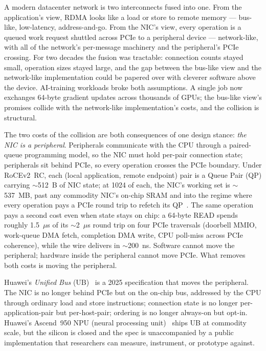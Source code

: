 \documentclass[10pt,twocolumn]{article}
\begin{document}
A modern datacenter network is two interconnects fused into one.
From the application's view, RDMA looks like a load or store to
remote memory --- bus-like, low-latency, address-and-go. From the
NIC's view, every operation is a queued work request shuttled
across PCIe to a peripheral device --- network-like, with all of
the network's per-message machinery and the peripheral's PCIe
crossing. For two decades the fusion was tractable: connection
counts stayed small, operation sizes stayed large, and the gap
between the bus-like view and the network-like implementation
could be papered over with cleverer software above the device.
AI-training workloads broke both assumptions. A single job now
exchanges 64-byte gradient updates across thousands of GPUs; the
bus-like view's promises collide with the network-like
implementation's costs, and the collision is structural.

The two costs of the collision are both consequences of one design
stance: \emph{the NIC is a peripheral}. Peripherals communicate
with the CPU through a paired-queue programming model, so the NIC
must hold per-pair connection state; peripherals sit behind PCIe,
so every operation crosses the PCIe boundary. Under RoCEv2~RC,
each (local application, remote endpoint) pair is a Queue Pair
(QP) carrying $\sim$512~B of NIC state; at 1024 of each, the NIC's
working set is $\sim$537~MB, past any commodity NIC's on-chip SRAM
and into the regime where every operation pays a PCIe round trip
to refetch its
QP~\cite{kong2022:collie,kalia:fasst-extended,wang2023:srnic}.
The same operation pays a second cost even when state stays on
chip: a 64-byte READ spends roughly 1.5~$\mu$s of its $\sim$2~$\mu$s
round trip on four PCIe traversals (doorbell MMIO, work-queue
DMA fetch, completion DMA write, CPU poll-miss across PCIe
coherence), while the wire delivers in $\sim$200~ns. Software
cannot move the peripheral; hardware inside the peripheral cannot
move PCIe. What removes both costs is moving the peripheral.

Huawei's \emph{Unified Bus} (UB)~\cite{ubspec} is a 2025
specification that moves the peripheral. The NIC is no longer
behind PCIe but on the on-chip bus, addressed by the CPU through
ordinary load and store instructions; connection state is no
longer per-application-pair but per-host-pair; ordering is no
longer always-on but opt-in. Huawei's Ascend~950
NPU (neural processing unit)~\cite{huawei2026:ascend950} ships UB
at commodity scale, but
the silicon is closed and the spec is unaccompanied by a public
implementation that researchers can measure, instrument, or
prototype against.
\end{document}
